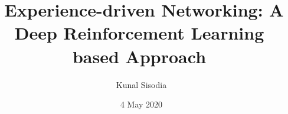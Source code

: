 \documentclass[10pt,a4paper,openright,twoside,twocolumn,DIV=35]{scrartcl}
\begin{document}
\title{\ Experience-driven Networking: A Deep
Reinforcement Learning based Approach}
\author{\ Kunal Sisodia}
\date{\ 4 May 2020}
\maketitle
\thispagestyle{empty}




\printbibliography
\end{document}
